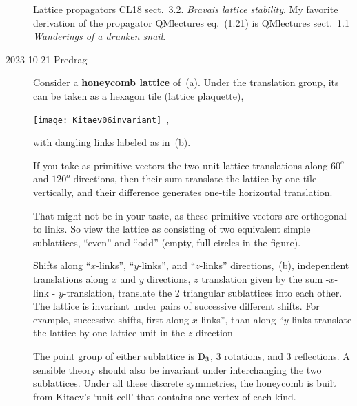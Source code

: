 \begin{description}
Lattice propagators
{CL18 sect.~3.2. \emph{Bravais lattice stability}}.
My favorite derivation of the propagator
{QMlectures eq.~(1.21)} is
{QMlectures sect.~1.1 {\em Wanderings of a drunken snail}}.

\item[2023-10-21 Predrag]

Consider a \textbf{honeycomb lattice} of \,(a).
Under the translation group, its {\pcell} can be taken as a hexagon tile
(lattice plaquette),

\texttt{[image: Kitaev06invariant]}
\,,

with dangling links labeled as in \,(b).

If you take as primitive vectors the two unit lattice translations along
$60^o$ and $120^o$ directions, then their sum translate the lattice
by one tile vertically, and their difference generates
one-tile horizontal translation.

That might not be in your taste, as these primitive vectors are
orthogonal to  {\pcell} links.
So view the lattice as consisting of two equivalent simple sublattices,
``even'' and ``odd'' (empty, full circles in the figure).

Shifts along ``$x$-links'', ``$y$-links'', and ``$z$-links'' directions,
\,(b), independent translations
along $x$ and $y$ directions, $z$ translation given by the sum
-$x$-link - $y$-translation, translate the 2 triangular sublattices
into each other. The lattice is invariant under pairs of
successive different shifts. For example, successive shifts, first along
$x$-links'', than along ``$y$-links translate the lattice by one lattice unit in the $z$ direction

The point group of either sublattice is $\textrm{D}_{3}$, 3 rotations, and 3
reflections. A sensible theory should also be invariant under
interchanging the two sublattices. Under all these discrete symmetries,
the honeycomb is built from Kitaev's `unit cell' that contains one vertex
of each kind.


\end{description}
